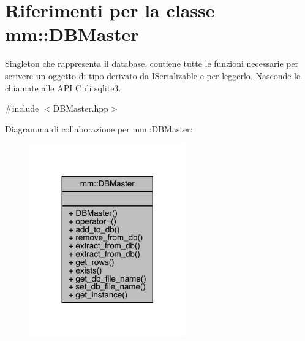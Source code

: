 \hypertarget{classmm_1_1_d_b_master}{}\section{Riferimenti per la classe mm\+:\+:D\+B\+Master}
\label{classmm_1_1_d_b_master}


Singleton che rappresenta il database, contiene tutte le funzioni necessarie per scrivere un oggetto di tipo derivato da \mbox{\hyperlink{classmm_1_1_i_serializable}{I\+Serializable}} e per leggerlo. Nasconde le chiamate alle A\+PI C di sqlite3.  




{\ttfamily \#include $<$D\+B\+Master.\+hpp$>$}



Diagramma di collaborazione per mm\+:\+:D\+B\+Master\+:
\nopagebreak
\begin{figure}[H]
\begin{center}
\leavevmode
\includegraphics[width=191pt]{d7/d6f/classmm_1_1_d_b_master__coll__graph}
\end{center}
\end{figure}
